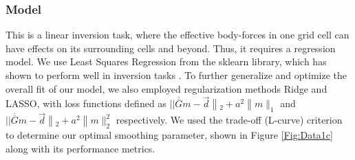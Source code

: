 \documentclass{article}
\begin{document}

\subsubsection{Model}

This is a linear inversion task, where the effective body-forces in one grid cell can have effects on its surrounding cells and beyond. Thus, it requires a regression model. We use Least Squares Regression from the sklearn library, which has shown to perform well in inversion tasks \cite{lines_review_1984}. To further generalize and optimize the overall fit of our model, we also employed regularization methods Ridge and LASSO, with loss functions defined as $|| \overline{\overline{G}} m-\vec{d}\left\|_{2}+a^{2}\right\| m \|_{1}$ and $|| \overline{\overline{G}} m-\vec{d}\left\|_{2}+a^{2}\right\| m \|_{2}^{2}$ respectively. We used the trade-off (L-curve) criterion to determine our optimal smoothing parameter, shown in Figure \ref{Fig:Data1c} along with its performance metrics.
\end{document}
